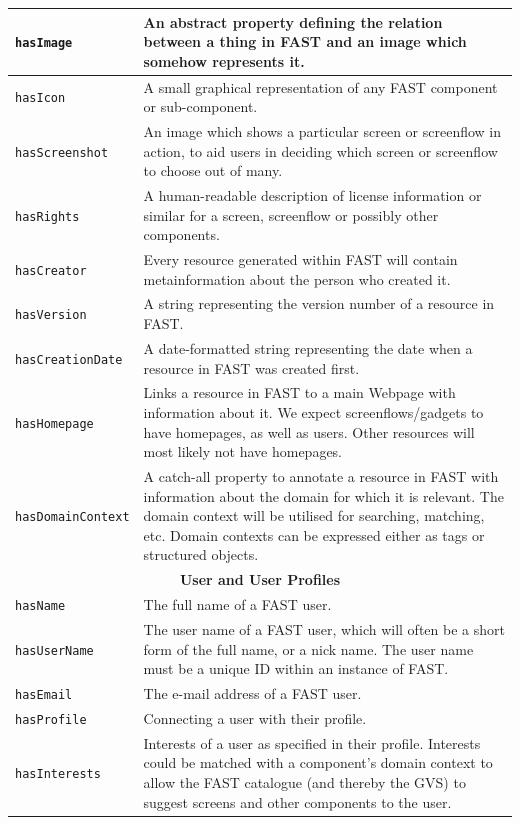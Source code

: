\documentclass{article}
\begin{document}
\begin{small}
\begin{longtable}{|p{3.25cm}|p{11cm}|}
\texttt{hasImage} & An abstract property defining the relation between a thing in FAST and an image which somehow represents it. \\ \hline
\texttt{hasIcon} & A small graphical representation of any FAST component or sub-component. \\ \hline
\texttt{hasScreenshot} & An image which shows a particular screen or screenflow in action, to aid users in deciding which screen or screenflow to choose out of many. \\ \hline
\texttt{hasRights} & A human-readable description of license information or similar for a screen, screenflow or possibly other components. \\ \hline
\texttt{hasCreator} & Every resource generated within FAST will contain metainformation about the person who created it. \\ \hline
\texttt{hasVersion} & A string representing the version number of a resource in FAST. \\ \hline
\texttt{hasCreationDate} & A date-formatted string representing the date when a resource in FAST was created first. \\ \hline
\texttt{hasHomepage} & Links a resource in FAST to a main Webpage with information about it. We expect screenflows/gadgets to have homepages, as well as users. Other resources will most likely not have homepages. \\ \hline
\texttt{hasDomainContext} & A catch-all property to annotate a resource in FAST with information about the domain for which it is relevant. The domain context will be utilised for searching, matching, etc. Domain contexts can be expressed either as tags or structured objects. \\ \hline
\multicolumn{2}{|c|}{\textbf{User and User Profiles}} \\ \hline
\texttt{hasName} & The full name of a FAST user. \\ \hline
\texttt{hasUserName} & The user name of a FAST user, which will often be a short form of the full name, or a nick name. The user name must be a unique ID within an instance of FAST. \\ \hline
\texttt{hasEmail} & The e-mail address of a FAST user. \\ \hline
\texttt{hasProfile} & Connecting a user with their profile. \\ \hline
\texttt{hasInterests} & Interests of a user as specified in their profile. Interests could be matched with a component's domain context to allow the FAST catalogue (and thereby the GVS) to suggest screens and other components to the user. \\ \hline
\end{longtable}
\end{small}
\doublespacing
\end{document}
